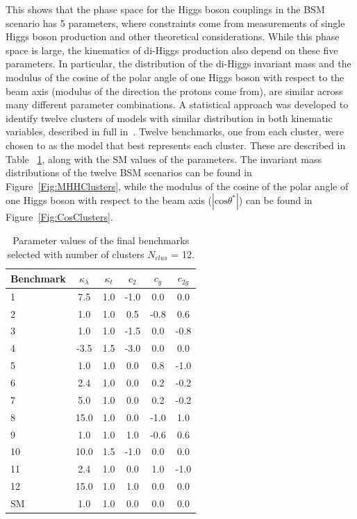 This shows that the phase space for the Higgs boson couplings in the BSM scenario has 5 parameters, where constraints come from measurements of single Higgs boson production and other theoretical considerations. While this phase space is large, the kinematics of di-Higgs production also depend on these five parameters. In particular, the distribution of the di-Higgs invariant mass and the modulus of the cosine of the polar angle of one Higgs boson with respect to the beam axis (modulus of the direction the protons come from), are similar across many different parameter combinations. 
A statistical approach was developed to identify twelve clusters of models with similar distribution in both kinematic variables, described in full in~\cite{Carvalho2016}. Twelve benchmarks, one from each cluster, were chosen to as the model that best represents each cluster. These are described in Table ~\ref{tab:benchmarks}, along with the SM values of the parameters. The invariant mass distributions of the twelve BSM scenarios can be found in Figure~\ref{Fig:MHHClusters}, while the modulus of the cosine of the polar angle of one Higgs boson with respect to the beam axis ($|\text{cos}\theta^{\ast}|$) can be found in Figure~\ref{Fig:CosClusters}.

\begin{table}[htb]
\begin{center}
\begin{tabular}{|l|c|c|c|c|c|}
\hline
Benchmark & $\kappa_{\lambda}$ & $\kappa_{t}$ & $c_2$ & $c_g$ & $c_{2g}$ \\ \hline 
1 & 7.5 & 1.0 & -1.0 & 0.0 & 0.0\\
2 & 1.0 & 1.0 & 0.5 & -0.8 & 0.6 \\
3 & 1.0 & 1.0 & -1.5 & 0.0 & -0.8 \\
4 & -3.5 & 1.5 & -3.0 & 0.0 & 0.0 \\
5 & 1.0 & 1.0 & 0.0 & 0.8 & -1.0 \\
6 & 2.4 & 1.0 & 0.0 & 0.2 & -0.2 \\
7 & 5.0 & 1.0 & 0.0 & 0.2 & -0.2 \\
8 & 15.0 & 1.0 & 0.0 & -1.0 & 1.0 \\
9 & 1.0 & 1.0 & 1.0 & -0.6 & 0.6 \\
10 & 10.0 & 1.5 & -1.0 & 0.0 & 0.0 \\
11 & 2.4 & 1.0 & 0.0 & 1.0 & -1.0 \\
12 & 15.0 & 1.0 & 1.0 & 0.0 & 0.0 \\
SM & 1.0 & 1.0 & 0.0 & 0.0 & 0.0 \\
\hline
\end{tabular}
\end{center}
\caption{Parameter values of the final benchmarks selected with number of clusters $N_{clus}$ = 12.}
\label{tab:benchmarks}
\end{table}

